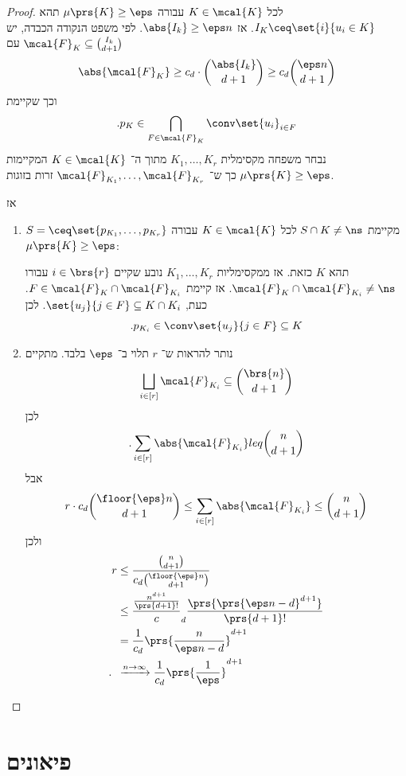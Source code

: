 \documentclass[a4paper,10pt,twoside,openany]{book}
\begin{document}
\begin{proof}
לכל
$K \in \mcal{K}$
עבורה
$\mu\prs{K} \geq \eps$
תהא
$I_K \ceq \set{i}{u_i \in K}$.
אז
$\abs{I_k} \geq \eps n$.
לפי משפט הנקודה הכבדה, יש
$\mcal{F}_K \subseteq \binom{I_k}{d+1}$
עם
\[\abs{\mcal{F}_K} \geq c_d \cdot \binom{\abs{I_k}}{d+1} \geq c_d \binom{\eps n}{d+1}\]
וכך שקיימת
\[\text{.} p_K \in \bigcap_{F \in \mcal{F}_K} \conv\set{u_i}_{i \in F}\]
נבחר משפחה מקסימלית
$K_1, \ldots, K_r$
מתוך ה־%
$K \in \mcal{K}$
המקיימות
$\mu\prs{K} \geq \eps$
כך ש־%
$\mcal{F}_{K_1}, \ldots, \mcal{F}_{K_r}$
זרות בזוגות.

אז
\begin{enumerate}
\item $S = \ceq \set{p_{K_1}, \ldots, p_{K_r}}$
מקיימת
$S \cap K \neq \ns$
לכל
$K \in \mcal{K}$
עבורה
$\mu\prs{K} \geq \eps$:

תהא
$K$
כזאת. אז ממקסימליות
$K_1, \ldots, K_r$
נובע שקיים
$i \in \brs{r}$
עבורו
$\mcal{F}_K \cap \mcal{F}_{K_i} \neq \ns$.
אז קיימת
$F \in \mcal{F}_K \cap \mcal{F}_{K_i}$.
כעת,
$\set{u_j}{j \in F} \subseteq K \cap K_i$.
לכן
\[\text{.} p_{K_i} \in \conv\set{u_j}{j \in F} \subseteq K\]

\item נותר להראות ש־%
$r$
תלוי ב־%
$\eps$
בלבד.
מתקיים
\begin{align*}
\bigsqcup_{i \in [r]} \mcal{F}_{K_i} \subseteq \binom{\brs{n}}{d+1}
\end{align*}
לכן
\[\text{.} \sum_{i \in [r]} \abs{\mcal{F}_{K_i}} \\leq \binom{n}{d+1}\]
אבל
\[r \cdot c_d \binom{\floor{\eps} n}{d+1} \leq \sum_{i \in [r]} \abs{\mcal{F}_{K_i}} \leq \binom{n}{d+1}\]
ולכן
\begin{align*}
r &\leq \frac{\binom{n}{d+1}}{c_d \binom{\floor{\eps}n}{d+1}}
\\&\leq \frac{\frac{n^{d+1}}{\prs{d+1}!}}c_d \frac{\prs{\prs{\eps n  - d}^{d+1}}}{\prs{d+1}!}
\\&= \frac{1}{c_d} \prs{\frac{n}{\eps n - d}}^{d+1}
\\ \text{.} \hphantom{r} &\xrightarrow{n\to\infty} \frac{1}{c_d} \prs{\frac{1}{\eps}}^{d+1}
\end{align*}
\end{enumerate}
\end{proof}

\chapter{פיאונים}

\backmatter
\end{document}
